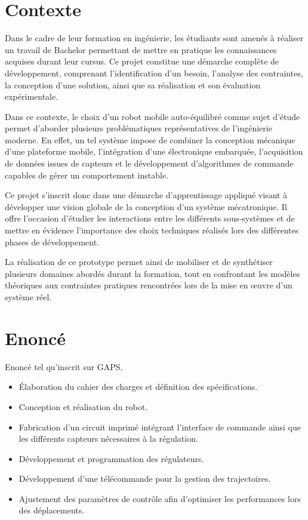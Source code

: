 \section{Contexte}

Dans le cadre de leur formation en ingénierie, les étudiants sont amenés à réaliser un travail de Bachelor permettant de mettre en pratique les connaissances acquises durant leur cursus. Ce projet constitue une démarche complète de développement, comprenant l'identification d'un besoin, l'analyse des contraintes, la conception d'une solution, ainsi que sa réalisation et son évaluation expérimentale.

Dans ce contexte, le choix d'un robot mobile auto-équilibré comme sujet d'étude permet d'aborder plusieurs problématiques représentatives de l'ingénierie moderne. En effet, un tel système impose de combiner la conception mécanique d'une plateforme mobile, l'intégration d'une électronique embarquée, l'acquisition de données issues de capteurs et le développement d'algorithmes de commande capables de gérer un comportement instable.

Ce projet s'inscrit donc dans une démarche d'apprentissage appliqué visant à développer une vision globale de la conception d'un système mécatronique. Il offre l'occasion d'étudier les interactions entre les différents sous-systèmes et de mettre en évidence l'importance des choix techniques réalisés lors des différentes phases de développement.

La réalisation de ce prototype permet ainsi de mobiliser et de synthétiser plusieurs domaines abordés durant la formation, tout en confrontant les modèles théoriques aux contraintes pratiques rencontrées lors de la mise en œuvre d'un système réel.
\section{Enoncé}
Enoncé tel qu'inscrit sur GAPS.
\begin{itemize}
    \item Élaboration du cahier des charges et définition des spécifications.
    \item Conception et réalisation du robot.
    \item Fabrication d'un circuit imprimé intégrant l'interface de commande ainsi que les différents capteurs nécessaires à la régulation.
    \item Développement et programmation des régulateurs.
    \item Développement d'une télécommande pour la gestion des trajectoires.
    \item Ajustement des paramètres de contrôle afin d'optimiser les performances lors des déplacements.
\end{itemize}


